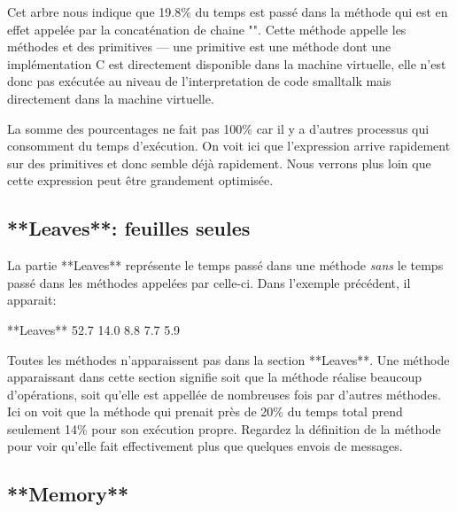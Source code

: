 \documentclass[a4paper,10pt,twoside]{book}
\begin{document}
Cet arbre nous indique que 19.8\% du temps est pass\'e dans la m\'ethode
 qui est en effet
appel\'ee par la concat\'enation de chaine "\ct{,}". Cette m\'ethode
appelle les m\'ethodes  et des primitives  --- une primitive
est une m\'ethode dont une impl\'ementation C est directement
disponible dans la machine virtuelle, elle n'est donc pas ex\'ecut\'ee
au niveau de l'interpretation de code smalltalk mais directement dans
la machine virtuelle. 

La somme des pourcentages ne fait pas 100\% car il y a d'autres processus qui
consomment du temps d'ex\'ecution. On voit ici que l'expression arrive 
rapidement sur des primitives et donc semble d\'ej\`a rapidement. Nous
verrons plus loin que cette expression peut \^etre grandement
optimis\'ee. 



\subsection{**Leaves**: feuilles seules}
La partie **Leaves** repr\'esente le temps pass\'e dans une m\'ethode
\emph{sans} le temps pass\'e dans les m\'ethodes appel\'ees par
celle-ci. Dans l'exemple pr\'ec\'edent, il apparait:

\begin{small}
\begin{sf}
**Leaves**
52.7%
14.0%
8.8%
7.7%
5.9%
\end{sf}
\end{small}


Toutes les m\'ethodes n'apparaissent pas dans la section
**Leaves**. Une m\'ethode apparaissant dans cette section signifie
soit que la m\'ethode r\'ealise beaucoup d'op\'erations, soit qu'elle
est appell\'ee de nombreuses fois par d'autres m\'ethodes.
Ici on voit que la m\'ethode  qui prenait
pr\`es de 20\% du temps total prend seulement 14\% pour son ex\'ecution
propre. Regardez la d\'efinition de la m\'ethode pour voir qu'elle
fait effectivement plus que quelques envois de messages. 


 \subsection{**Memory**}
\end{document}
